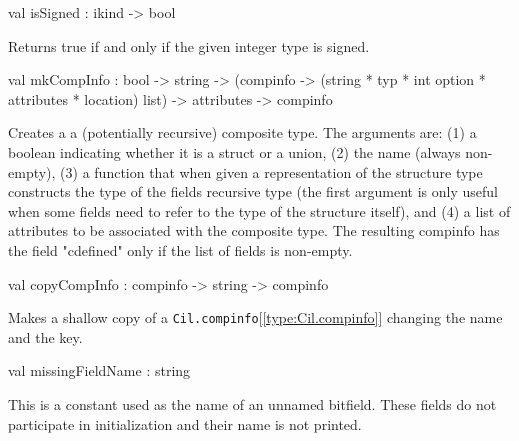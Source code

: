\documentclass[11pt]{article}
\begin{document}
\label{val:Cil.isSigned}\begin{ocamldoccode}
val isSigned : ikind -> bool
\end{ocamldoccode}
\begin{ocamldocdescription}
Returns true if and only if the given integer type is signed.


\end{ocamldocdescription}




\label{val:Cil.mkCompInfo}\begin{ocamldoccode}
val mkCompInfo :
  bool ->
  string ->
  (compinfo ->
   (string * typ * int option * attributes * location) list) ->
  attributes -> compinfo
\end{ocamldoccode}
\begin{ocamldocdescription}
Creates a a (potentially recursive) composite type. The arguments are: 
 (1) a boolean indicating whether it is a struct or a union, (2) the name 
 (always non-empty), (3) a function that when given a representation of the 
 structure type constructs the type of the fields recursive type (the first 
 argument is only useful when some fields need to refer to the type of the 
 structure itself), and (4) a list of attributes to be associated with the 
 composite type. The resulting compinfo has the field "cdefined" only if 
 the list of fields is non-empty.


\end{ocamldocdescription}




\label{val:Cil.copyCompInfo}\begin{ocamldoccode}
val copyCompInfo : compinfo -> string -> compinfo
\end{ocamldoccode}
\begin{ocamldocdescription}
Makes a shallow copy of a {\tt{Cil.compinfo}}[\ref{type:Cil.compinfo}] changing the name and the key.


\end{ocamldocdescription}




\label{val:Cil.missingFieldName}\begin{ocamldoccode}
val missingFieldName : string
\end{ocamldoccode}
\begin{ocamldocdescription}
This is a constant used as the name of an unnamed bitfield. These fields
    do not participate in initialization and their name is not printed.


\end{ocamldocdescription}
\end{document}
